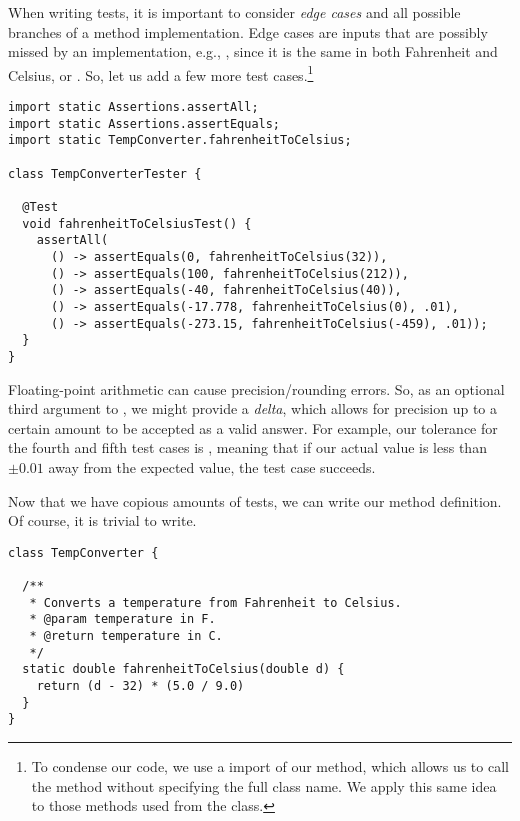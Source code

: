 When writing tests, it is important to consider \textit{edge cases} and all possible branches of a method implementation. Edge cases are inputs that are possibly missed by an implementation, e.g., , since it is the same in both Fahrenheit and Celsius, or . So, let us add a few more test cases.\footnote{To condense our code, we use a  import of our  method, which allows us to call the method without specifying the full class name. We apply this same idea to those methods used from the  class.}

\begin{cl}[]{}
\begin{lstlisting}[language=MyJava]
import static Assertions.assertAll;
import static Assertions.assertEquals;
import static TempConverter.fahrenheitToCelsius;

class TempConverterTester {

  @Test
  void fahrenheitToCelsiusTest() {
    assertAll(
      () -> assertEquals(0, fahrenheitToCelsius(32)),
      () -> assertEquals(100, fahrenheitToCelsius(212)),
      () -> assertEquals(-40, fahrenheitToCelsius(40)),
      () -> assertEquals(-17.778, fahrenheitToCelsius(0), .01),
      () -> assertEquals(-273.15, fahrenheitToCelsius(-459), .01));
  }
}
\end{lstlisting}
\end{cl}

Floating-point arithmetic can cause precision/rounding errors. So, as an optional third argument to , we might provide a \textit{delta}, which allows for precision up to a certain amount to be accepted as a valid answer. For example, our tolerance for the fourth and fifth test cases is , meaning that if our actual value is less than $\pm 0.01$ away from the expected value, the test case succeeds.

Now that we have copious amounts of tests, we can write our method definition. Of course, it is trivial to write.

\begin{cl}[]{}
\begin{lstlisting}[language=MyJava]
class TempConverter {

  /**
   * Converts a temperature from Fahrenheit to Celsius.
   * @param temperature in F.
   * @return temperature in C.
   */
  static double fahrenheitToCelsius(double d) {
    return (d - 32) * (5.0 / 9.0)
  }
}
\end{lstlisting}
\end{cl}

